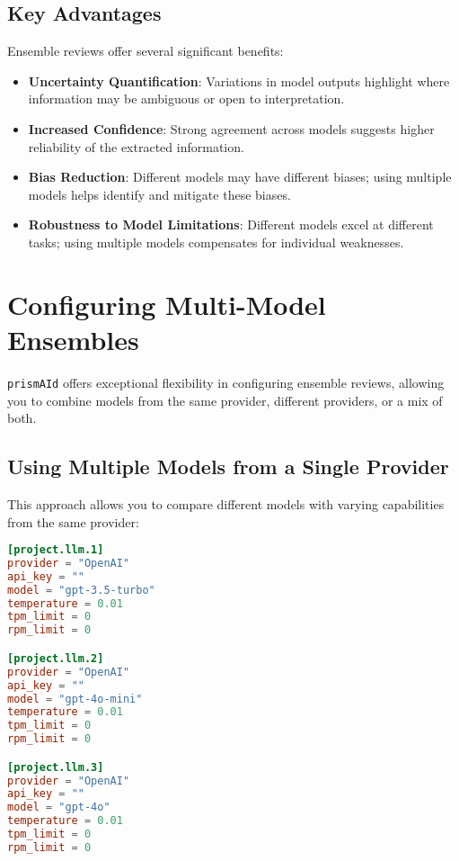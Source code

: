 \subsection{Key Advantages}

Ensemble reviews offer several significant benefits:

\begin{itemize}
    \item \textbf{Uncertainty Quantification}: Variations in model outputs highlight where information may be ambiguous or open to interpretation.
    \item \textbf{Increased Confidence}: Strong agreement across models suggests higher reliability of the extracted information.
    \item \textbf{Bias Reduction}: Different models may have different biases; using multiple models helps identify and mitigate these biases.
    \item \textbf{Robustness to Model Limitations}: Different models excel at different tasks; using multiple models compensates for individual weaknesses.
\end{itemize}

\section{Configuring Multi-Model Ensembles}

\texttt{prismAId} offers exceptional flexibility in configuring ensemble reviews, allowing you to combine models from the same provider, different providers, or a mix of both.

\subsection{Using Multiple Models from a Single Provider}

This approach allows you to compare different models with varying capabilities from the same provider:

\begin{configbox}
\begin{lstlisting}[language=TOML]
[project.llm.1]
provider = "OpenAI"
api_key = ""
model = "gpt-3.5-turbo"
temperature = 0.01
tpm_limit = 0
rpm_limit = 0

[project.llm.2]
provider = "OpenAI"
api_key = ""
model = "gpt-4o-mini"
temperature = 0.01
tpm_limit = 0
rpm_limit = 0

[project.llm.3]
provider = "OpenAI"
api_key = ""
model = "gpt-4o"
temperature = 0.01
tpm_limit = 0
rpm_limit = 0
\end{lstlisting}
\end{configbox}

